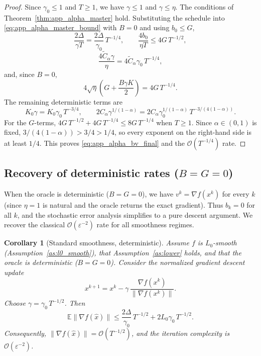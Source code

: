 \documentclass[letter,11pt]{article}
\newtheorem{corollary}{Corollary}[theorem]
\newcommand{\E}{\mathbb{E}}
\newcommand{\Ocal}{\mathcal{O}}
\begin{document}
\begin{proof}
Since $\gamma_0\le 1$ and $T\ge 1$, we have $\gamma\le 1$ and $\gamma\le\eta$.
The conditions of Theorem~\ref{thm:app_alpha_master} hold. Substituting the
schedule into \eqref{eq:app_alpha_master_bound} with $B=0$ and using $b_0\le G$,
\[
    \frac{2\Delta}{\gamma T}
    = \frac{2\Delta}{\gamma_0}\,T^{-1/4},
    \qquad
    \frac{4b_0}{\eta T}
    \le 4G\,T^{-1/2},
\]
\[
    \frac{4\widetilde C_\alpha\gamma}{\eta}
    = 4\widetilde C_\alpha\gamma_0\,T^{-1/4},
\]
and, since $B=0$,
\[
    4\sqrt{\eta}\left(G + \frac{B\gamma K}{2}\right)
    = 4G\,T^{-1/4}.
\]
The remaining deterministic terms are
\[
    K_0\gamma = K_0\gamma_0\,T^{-3/4},
    \qquad
    2C_\alpha\gamma^{1/(1-\alpha)}
    = 2C_\alpha\gamma_0^{1/(1-\alpha)}\,T^{-3/(4(1-\alpha))}.
\]
For the $G$-terms, $4G\,T^{-1/2} + 4G\,T^{-1/4} \le 8G\,T^{-1/4}$ when $T\ge 1$.
Since $\alpha\in(0,1)$ is fixed, $3/(4(1-\alpha)) > 3/4 > 1/4$, so every
exponent on the right-hand side is at least $1/4$. This proves
\eqref{eq:app_alpha_bv_final} and the $\Ocal(T^{-1/4})$ rate.
\end{proof}

\subsection{Recovery of deterministic rates (\texorpdfstring{$B=G=0$}{B=G=0})}
\label{app:nsgdm_det_recovery}

When the oracle is deterministic ($B=G=0$), we have $v^k=\nabla f(x^k)$ for
every $k$ (since $\eta=1$ is natural and the oracle returns the exact
gradient). Thus $b_k=0$ for all $k$, and the stochastic error analysis
simplifies to a pure descent argument. We recover the classical
$\Ocal(\varepsilon^{-2})$ rate for all smoothness regimes.

\begin{corollary}[Standard smoothness, deterministic]
\label{cor:app_nsgdm_smooth_det}
Assume $f$ is $L_0$-smooth (Assumption~\ref{as:l0_smooth}), that
Assumption~\ref{as:lower} holds, and that the oracle is deterministic
($B=G=0$). Consider the normalized gradient descent update
\[
    x^{k+1} = x^k - \gamma\,\frac{\nabla f(x^k)}{\|\nabla f(x^k)\|}.
\]
Choose $\gamma = \gamma_0\,T^{-1/2}$. Then
\begin{equation}
\label{eq:app_smooth_det_final}
    \E\|\nabla f(\widehat x)\|
    \le
    \frac{2\Delta}{\gamma_0}\,T^{-1/2}
    + 2L_0\gamma_0\,T^{-1/2}.
\end{equation}
Consequently,
$\|\nabla f(\widehat x)\| = \Ocal(T^{-1/2})$,
and the iteration complexity is $\Ocal(\varepsilon^{-2})$.
\end{corollary}
\end{document}
